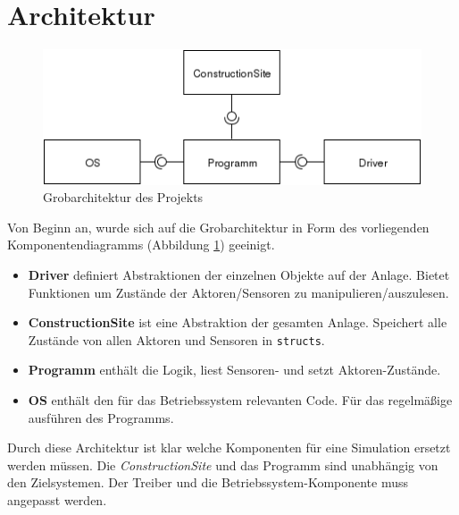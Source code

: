 \documentclass[fontsize=11pt,a4paper,final]{scrartcl}[2003/01/01]
\makeatletter
\def\ScaleIfNeeded{%
	\ifdim\Gin@nat@width>\linewidth
		\linewidth
	\else
		\Gin@nat@width
	\fi
}
\makeatother
\begin{document}
\section{Architektur}
\label{sec:arch}

\begin{figure}[H]
	\centering
	\includegraphics[width=0.7\ScaleIfNeeded]{Bilder/architektur.png}
	\caption{Grobarchitektur des Projekts}
	\label{fig:Architektur}
\end{figure}
Von Beginn an, wurde sich auf die Grobarchitektur in Form des vorliegenden Komponentendiagramms (Abbildung \ref{fig:Architektur}) geeinigt.

\begin{itemize}
 \item \textbf{Driver} definiert Abstraktionen der einzelnen Objekte auf der Anlage. Bietet Funktionen um Zustände der Aktoren/Sensoren zu manipulieren/auszulesen.
 \item \textbf{ConstructionSite} ist eine Abstraktion der gesamten Anlage. Speichert alle Zustände von allen Aktoren und Sensoren in \lstinline|structs|.
 \item \textbf{Programm} enthält die Logik, liest Sensoren- und setzt Aktoren-Zustände.
 \item \textbf{OS} enthält den für das Betriebssystem relevanten Code. Für das regelmäßige ausführen des Programms.
\end{itemize}

\noindent Durch diese Architektur ist klar welche Komponenten für eine Simulation ersetzt werden müssen. Die \textit{ConstructionSite} und das Programm sind unabhängig von den Zielsystemen. Der Treiber und die Betriebssystem-Komponente muss angepasst werden.\\
\\
\end{document}
